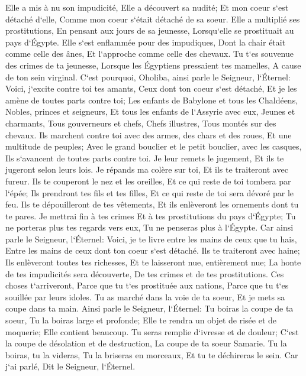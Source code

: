 \verse Elle a mis à nu son impudicité, Elle a découvert sa nudité; Et mon coeur s`est détaché d`elle, Comme mon coeur s`était détaché de sa soeur. 
\verse Elle a multiplié ses prostitutions, En pensant aux jours de sa jeunesse, Lorsqu`elle se prostituait au pays d`Égypte. 
\verse Elle s`est enflammée pour des impudiques, Dont la chair était comme celle des ânes, Et l`approche comme celle des chevaux. 
\verse Tu t`es souvenue des crimes de ta jeunesse, Lorsque les Égyptiens pressaient tes mamelles, A cause de ton sein virginal. 
\verse C`est pourquoi, Oholiba, ainsi parle le Seigneur, l`Éternel: Voici, j`excite contre toi tes amants, Ceux dont ton coeur s`est détaché, Et je les amène de toutes parts contre toi; 
\verse Les enfants de Babylone et tous les Chaldéens, Nobles, princes et seigneurs, Et tous les enfants de l`Assyrie avec eux, Jeunes et charmants, Tous gouverneurs et chefs, Chefs illustres, Tous montés sur des chevaux. 
\verse Ils marchent contre toi avec des armes, des chars et des roues, Et une multitude de peuples; Avec le grand bouclier et le petit bouclier, avec les casques, Ils s`avancent de toutes parts contre toi. Je leur remets le jugement, Et ils te jugeront selon leurs lois. 
\verse Je répands ma colère sur toi, Et ils te traiteront avec fureur. Ils te couperont le nez et les oreilles, Et ce qui reste de toi tombera par l`épée; Ils prendront tes fils et tes filles, Et ce qui reste de toi sera dévoré par le feu. 
\verse Ils te dépouilleront de tes vêtements, Et ils enlèveront les ornements dont tu te pares. 
\verse Je mettrai fin à tes crimes Et à tes prostitutions du pays d`Égypte; Tu ne porteras plus tes regards vers eux, Tu ne penseras plus à l`Égypte. 
\verse Car ainsi parle le Seigneur, l`Éternel: Voici, je te livre entre les mains de ceux que tu hais, Entre les mains de ceux dont ton coeur s`est détaché. 
\verse Ils te traiteront avec haine; Ils enlèveront toutes tes richesses, Et te laisseront nue, entièrement nue; La honte de tes impudicités sera découverte, De tes crimes et de tes prostitutions. 
\verse Ces choses t`arriveront, Parce que tu t`es prostituée aux nations, Parce que tu t`es souillée par leurs idoles. 
\verse Tu as marché dans la voie de ta soeur, Et je mets sa coupe dans ta main. 
\verse Ainsi parle le Seigneur, l`Éternel: Tu boiras la coupe de ta soeur, Tu la boiras large et profonde; Elle te rendra un objet de risée et de moquerie; Elle contient beaucoup. 
\verse Tu seras remplie d`ivresse et de douleur; C`est la coupe de désolation et de destruction, La coupe de ta soeur Samarie. 
\verse Tu la boiras, tu la videras, Tu la briseras en morceaux, Et tu te déchireras le sein. Car j`ai parlé, Dit le Seigneur, l`Éternel. 
